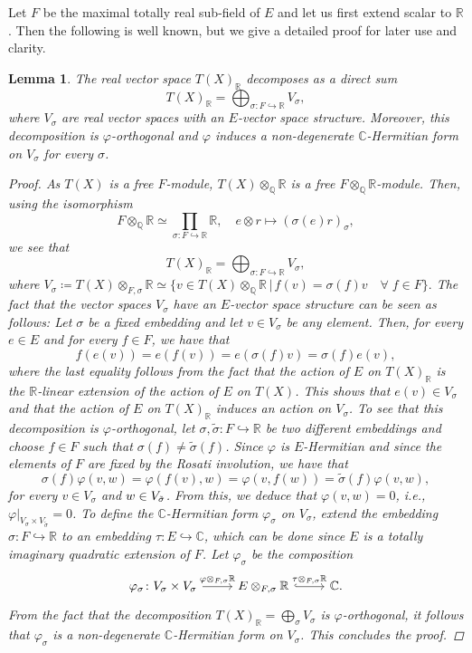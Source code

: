 \documentclass[11pt,twoside,a4paper]{amsart}
\newcommand{\0}{\mathscr{O}}
\newcommand{\R}{\mathbb{R}}
\newcommand{\Q}{\mathbb{Q}}
\newcommand{\C}{\mathbb{C}}
\newcommand{\s}{\sigma}
\theoremstyle{plain}
\newtheorem{lem}[thm]{Lemma}
\theoremstyle{definition}
\theoremstyle{remark}
\begin{document}
Let $F$ be the maximal totally real sub-field of $E$ and let us first extend scalar to $\R$. Then the following is well known, but we give a detailed proof for later use and clarity.
\begin{lem}
\label{lem: Hermitian form on V_s}
The real vector space $T(X)_\R$ decomposes as a direct sum 
\[T(X)_\R=\displaystyle\bigoplus_{\sigma\colon F\hookrightarrow \R}V_\s,\]
where $V_\s$ are real vector spaces with an $E$-vector space structure. Moreover, this decomposition is $\varphi$-orthogonal and $\varphi$ induces a non-degenerate $\C$-Hermitian form  on $V_\s$ for every $\s$.
\begin{proof}
As $T(X)$ is a free $F$-module, $T(X)\otimes_\Q\R$ is a free $F\otimes_\Q\R$-module. Then, using the isomorphism 
\[F\otimes_\Q\R\simeq \prod_{\sigma\colon F\hookrightarrow\R}\R, \quad e\otimes r\mapsto (\s(e)r)_\s,\]
we see that 
\[T(X)_\R=\displaystyle\bigoplus_{\sigma\colon F\hookrightarrow \R}V_\s,\]
where $V_\s\coloneqq T(X)\otimes_{F,\s}\R\simeq\{v\in T(X)\otimes_{\Q}\R \,| \,f(v)=\s(f)v \quad \forall \; f\in F\}.$
The fact that the vector spaces $V_\s$ have an $E$-vector space structure can be seen as follows: Let $\sigma$ be a fixed embedding and let $v\in V_\s$ be any element. Then, for every $e\in E$ and for every $f\in F$, we have that
\[f(e(v))=e(f(v))=e(\sigma(f)v)=\sigma(f)e(v),\]
where the last equality follows from the fact that the action of $E$ on $T(X)_\R$ is the $\R$-linear extension of the action of $E$ on $T(X)$. This shows that $e(v)\in V_\s$ and that the action of $E$ on $T(X)_\R$ induces an action on $V_\s$.
To see that this decomposition is $\varphi$-orthogonal, let $\s,\widetilde{\s}\colon F\hookrightarrow \R$ be two different embeddings and choose $f\in F$ such that $\s(f)\not=\widetilde{\s}(f)$. Since $\varphi$ is $E$-Hermitian and since the elements of $F$ are fixed by the Rosati involution, we have that
\[\s(f)\varphi(v,w)=\varphi(f(v),w)=\varphi(v,f(w))=\widetilde{\s}(f)\varphi(v,w),\]
for every $v\in V_\s$ and $w\in V_{\Tilde{\s}}$. From this, we deduce that $\varphi(v,w)=0$, i.e., $\varphi|_{V_\s\times V_{\widetilde{\s}}}=0$.
To define the $\C$-Hermitian form $\varphi_\s$ on $V_\s$, extend the embedding $\s\colon F\hookrightarrow\R$ to an embedding $\tau\colon E\hookrightarrow\C$, which can be done since $E$ is a totally imaginary quadratic extension of $F$.
Let $\varphi_\s$ be the composition
\[\begin{tikzcd}
\varphi_\s\colon V_\s\times V_\s \arrow[r, "{\varphi\otimes_{F,\s}\R}"] & {E\otimes_{F,\s}\R} \arrow[r, hook, "{\tau\otimes_{F,\s}\R}"] & \C.
\end{tikzcd}
\]
 From the fact that the decomposition $T(X)_\R=\bigoplus_\s V_\s$ is $\varphi$-orthogonal, it follows that $\varphi_\s$ is a non-degenerate $\C$-Hermitian form on $V_\s$. This concludes the proof.
\end{proof}
\end{lem}
\end{document}
